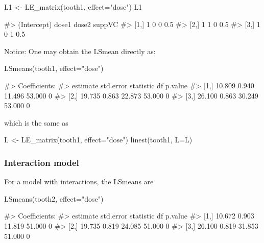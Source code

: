 \begin{Schunk}
\begin{Sinput}
L1 <- LE_matrix(tooth1, effect="dose")
L1
\end{Sinput}
\begin{Soutput}
#>      (Intercept) dose1 dose2 suppVC
#> [1,]           1     0     0    0.5
#> [2,]           1     1     0    0.5
#> [3,]           1     0     1    0.5
\end{Soutput}
\end{Schunk}

Notice: One may obtain the LSmean directly as:

\begin{Schunk}
\begin{Sinput}
LSmeans(tooth1, effect="dose")
\end{Sinput}
\begin{Soutput}
#> Coefficients:
#>      estimate std.error statistic     df p.value
#> [1,]   10.809     0.940    11.496 53.000       0
#> [2,]   19.735     0.863    22.873 53.000       0
#> [3,]   26.100     0.863    30.249 53.000       0
\end{Soutput}
\end{Schunk}

which is the same as

\begin{Schunk}
\begin{Sinput}
L <- LE_matrix(tooth1, effect="dose")
linest(tooth1, L=L)
\end{Sinput}
\end{Schunk}

\hypertarget{interaction-model}{%
\subsubsection{Interaction model}\label{interaction-model}}

For a model with interactions, the LSmeans are

\begin{Schunk}
\begin{Sinput}
LSmeans(tooth2, effect="dose")
\end{Sinput}
\begin{Soutput}
#> Coefficients:
#>      estimate std.error statistic     df p.value
#> [1,]   10.672     0.903    11.819 51.000       0
#> [2,]   19.735     0.819    24.085 51.000       0
#> [3,]   26.100     0.819    31.853 51.000       0
\end{Soutput}
\end{Schunk}


